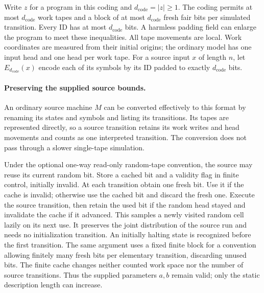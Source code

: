 Write $z$ for a program in this coding and
$d_{\mathrm{code}}=|z|\ge1$.  The coding permits at most
$d_{\mathrm{code}}$ work tapes and a block of at most
$d_{\mathrm{code}}$ fresh fair bits per simulated transition.  Every ID
has at most $d_{\mathrm{code}}$ bits.  A harmless padding field can enlarge
the program to meet these inequalities.  All tape movements are local.
Work coordinates are measured from their initial origins; the ordinary
model has one input head and one head per work tape.  For a source input
$x$ of length $n$, let $E_{d_{\mathrm{code}}}(x)$ encode each of its
symbols by its ID padded to exactly $d_{\mathrm{code}}$ bits.

\paragraph{Preserving the supplied source bounds.}
An ordinary source machine $M$ can be converted effectively to this format
by renaming its states and symbols and listing its transitions.  Its tapes
are represented directly, so a source transition retains its work writes
and head movements and counts as one interpreted transition.  The
conversion does not pass through a slower single-tape simulation.

Under the optional one-way read-only random-tape convention, the source
may reuse its current random bit. Store a cached bit and a validity flag
in finite control, initially invalid.
At each transition obtain one fresh bit.  Use it if the cache is invalid;
otherwise use the cached bit and discard the fresh one.  Execute the
source transition, then retain the used bit if the random head stayed
and invalidate the cache if it advanced.  This samples a newly visited
random cell lazily on its next use.  It preserves the joint distribution
of the source run and needs no initialization transition.  An initially
halting state is recognized before the first transition.  The same
argument uses a fixed finite block for a convention allowing finitely
many fresh bits per elementary transition, discarding unused bits.
The finite cache changes neither counted work space nor the number of
source transitions.  Thus the supplied parameters $a,b$ remain valid;
only the static description length can increase.

